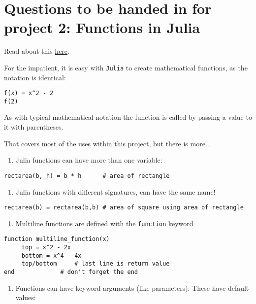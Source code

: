 \documentclass[12pt]{article}
\begin{document}
\section{Questions to be handed in for project 2: Functions in Julia}

Read about this \href{http://mth229.github.io/functions.html}{here}.

For the impatient, it is easy with \texttt{Julia} to create mathematical
functions, as the notation is identical:



\begin{verbatim}
f(x) = x^2 - 2
f(2)
\end{verbatim}
As with typical mathematical notation the function is called by passing
a value to it with parentheses.

That covers most of the uses within this project, but there is more...

\begin{enumerate}
\def\labelenumi{\arabic{enumi})}
\itemsep1pt\parskip0pt
\item
  Julia functions can have more than one variable:
\end{enumerate}



\begin{verbatim}
rectarea(b, h) = b * h      # area of rectangle
\end{verbatim}
\begin{enumerate}
\def\labelenumi{\arabic{enumi})}
\setcounter{enumi}{1}
\itemsep1pt\parskip0pt
\item
  Julia functions with different signatures, can have the same name!
\end{enumerate}



\begin{verbatim}
rectarea(b) = rectarea(b,b) # area of square using area of rectangle
\end{verbatim}
\begin{enumerate}
\def\labelenumi{\arabic{enumi})}
\setcounter{enumi}{2}
\itemsep1pt\parskip0pt
\item
  Multiline functions are defined with the \texttt{function} keyword
\end{enumerate}



\begin{verbatim}
function multiline_function(x)
     top = x^2 - 2x
     bottom = x^4 - 4x
     top/bottom     # last line is return value
end             # don't forget the end
\end{verbatim}
\begin{enumerate}
\def\labelenumi{\arabic{enumi})}
\setcounter{enumi}{3}
\itemsep1pt\parskip0pt
\item
  Functions can have keyword arguments (like parameters). These have
  default values:
\end{enumerate}
\end{document}
